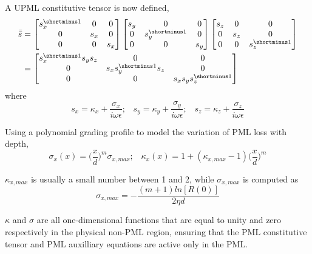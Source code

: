 \documentclass[]{article}
\begin{document}
		A UPML constitutive tensor is now defined,
		\begin{align}
			\bar{\bar{s}} &= \begin{bmatrix}s_{x}^{\shortminus 1} & 0 & 0 \\ 0 & s_{x} & 0 \\ 0 & 0 & s_{x}\end{bmatrix}\begin{bmatrix}s_{y} & 0 & 0 \\ 0 & s_{y}^{\shortminus 1} & 0 \\ 0 & 0 & s_{y}\end{bmatrix}\begin{bmatrix}s_{z} & 0 & 0 \\ 0 & s_{z} & 0 \\ 0 & 0 & s_{z}^{\shortminus 1}\end{bmatrix} \\
			&= \begin{bmatrix}s_{x}^{\shortminus 1}s_{y}s_{z} & 0 & 0 \\ 0 & s_{x}s_{y}^{\shortminus 1}s_{z} & 0 \\ 0 & 0 & s_{x}s_{y}s_{z}^{\shortminus 1}\end{bmatrix}
		\end{align}
		where 
		\begin{equation}
			s_{x} = \kappa_{x} + \frac{\sigma_{x}}{i\omega\epsilon};\;\;\; s_{y} = \kappa_{y} + \frac{\sigma_{y}}{i\omega\epsilon};\;\;\; s_{z} = \kappa_{z} + \frac{\sigma_{z}}{i\omega\epsilon}
		\end{equation}
		
		Using a polynomial grading profile to model the variation of PML loss with depth,
		\begin{equation}
			\sigma_{x}(x) = \bigg(\frac{x}{d}\bigg)^{m}\sigma_{x,max}; \;\;\; \kappa_{x}(x) = 1 + (\kappa_{x,max} - 1)\bigg(\frac{x}{d}\bigg)^{m}
		\end{equation}
		
		$\kappa_{x,max}$ is usually a small number between 1 and 2, while $\sigma_{x, max}$ is computed as
		\begin{equation}
			\sigma_{x, max} = -\frac{(m + 1)ln[R(0)]}{2\eta d}
		\end{equation}
		
		$\kappa$ and $\sigma$ are all one-dimensional functions that are equal to unity and zero respectively in the physical non-PML region, ensuring that the PML constitutive tensor and PML auxilliary equations are active only in the PML.
		
\end{document}
